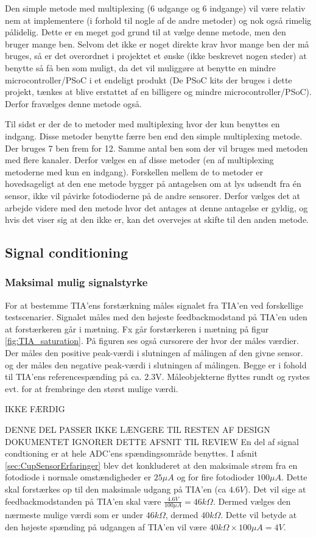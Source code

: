 \documentclass[HardwareDesign/HardwareDesign_main.tex]{subfiles}
\begin{document}
Den simple metode med multiplexing (6 udgange og 6 indgange) vil være relativ nem at implementere (i forhold til nogle af de andre metoder) og nok også rimelig pålidelig. Dette er en meget god grund til at vælge denne metode, men den bruger mange ben. Selvom det ikke er noget direkte krav hvor mange ben der må bruges, så er det overordnet i projektet et ønske (ikke beskrevet nogen steder) at benytte så få ben som muligt, da det vil muliggøre at benytte en mindre microcontroller/PSoC i et endeligt produkt (De PSoC kits der bruges i dette projekt, tænkes at blive erstattet af en billigere og mindre microcontroller/PSoC). Derfor fravælges denne metode også.

Til sidst er der de to metoder med multiplexing hvor der kun benyttes en indgang. Disse metoder benytte færre ben end den simple multiplexing metode. Der bruges 7 ben frem for 12. Samme antal ben som der vil bruges med metoden med flere kanaler. Derfor vælges en af disse metoder (en af multiplexing metoderne med kun en indgang). Forskellen mellem de to metoder er hovedsageligt at den ene metode bygger på antagelsen om at lys udsendt fra én sensor, ikke vil påvirke fotodioderne på de andre sensorer. Derfor vælges det at arbejde videre med den metode hvor det antages at denne antagelse er gyldig, og hvis det viser sig at den ikke er, kan det overvejes at skifte til den anden metode.
\newpage
\subsection{Signal conditioning}

\subsubsection{Maksimal mulig signalstyrke}
{
For at bestemme TIA'ens forstærkning måles signalet fra TIA'en ved forskellige testscenarier. Signalet måles med den højeste feedbackmodstand på TIA'en uden at forstærkeren går i mætning. Fx går forstærkeren i mætning på figur \ref{fig:TIA_saturation}. På figuren ses også cursorere der hvor der måles værdier. Der måles den positive peak-værdi i slutningen af målingen af den givne sensor. og der måles den negative peak-værdi i slutningen af målingen. Begge er i fohold til TIA'ens referencespænding på ca. 2.3V. Måleobjekterne flyttes rundt og rystes evt. for at frembringe den størst mulige værdi.

IKKE FÆRDIG
}

DENNE DEL PASSER IKKE LÆNGERE TIL RESTEN AF DESIGN DOKUMENTET IGNORER DETTE AFSNIT TIL REVIEW
En del af signal condtioning er at hele ADC'ens spændingsområde benyttes. I afsnit \ref{sec:CupSensorErfaringer} blev det konkluderet at den maksimale strøm fra en fotodiode i normale omstændigheder er $25\si{\mu A}$  og for fire fotodioder $100\si{\mu A}$. Dette skal forstærkes op til den maksimale udgang på TIA'en (ca $4.6\si{V}$). Det vil sige at feedbackmodstanden på TIA'en skal være $\frac{4.6\si{V}}{100\si{\mu A}} = 46\si{k\Omega}$. Dermed vælges den nærmeste mulige værdi som er under $46\si{k\Omega}$, dermed $40\si{k\Omega}$. Dette vil betyde at den højeste spænding på udgangen af TIA'en vil være $40\si{k\Omega} \times 100\si{\mu A} = 4\si{V}$.
\end{document}
